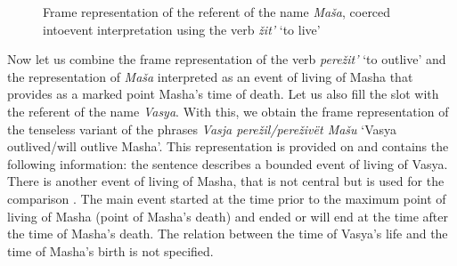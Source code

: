 \begin{figure}
\centering
{}
\caption{Frame representation of the referent of the name \textit{Ma\v{s}a}, coerced intoevent interpretation using the verb \textit{\v{z}it'} `to live' \label{frame:Masha:live}}
\end{figure}

Now let us combine the frame representation of the verb \textit{pere\v{z}it'} `to outlive' and the representation of \textit{Ma\v{s}a} interpreted as an event of living of Masha that provides as a marked point Masha's time of death. Let us also fill the \ACTOR slot with the referent of the name \textit{Vasya}. With this, we obtain the frame representation of the tenseless variant of the phrases \textit{Vasja pere\v{z}il/pere\v{z}iv\"{e}t Ma\v{s}u} `Vasya outlived/will outlive Masha'. This representation is provided on  and contains the following information: the sentence describes a bounded event  of living of Vasya. There is another event  of living of Masha, that is not central but is used for the comparison . The main event  started at the time prior to the maximum point of living of Masha (point of Masha's death) and ended or will end at the time after the time of Masha's death. The relation between the time of Vasya's life and the time of Masha's birth is not specified.

